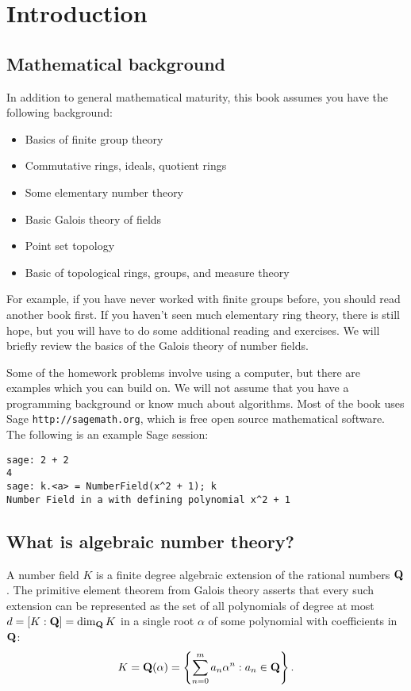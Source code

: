 \chapter{Introduction}

\section{Mathematical background}
In addition to general mathematical maturity, 
this book assumes you have the following background:
\begin{itemize}\setlength{\itemsep}{-.7ex}
\item Basics of finite group theory
\item Commutative rings, ideals, quotient rings
\item Some elementary number theory
\item Basic Galois theory of fields
\item Point set topology
\item Basic of topological rings, groups, and measure theory
\end{itemize}
For example, if you have never worked with finite groups before, you
should read another book first. If you haven't seen much elementary
ring theory, there is still hope, but you will have to do some
additional reading and exercises.  We will briefly review the basics of
the Galois theory of number fields.

Some of the homework problems involve using a computer, but there
are examples which you can build on.  We will not assume that you have
a programming background or know much about algorithms. Most
of the book uses Sage {\tt http://sagemath.org}, which is
free open source mathematical software.  The following is an example
Sage session:
\begin{verbatim}
sage: 2 + 2
4 
sage: k.<a> = NumberField(x^2 + 1); k
Number Field in a with defining polynomial x^2 + 1
\end{verbatim}

\section{What is algebraic number theory?}
A number field $K$ is a finite degree algebraic extension of the rational
numbers $\mathbf{Q}$.  The primitive element theorem from Galois theory
asserts that every such extension can be represented as the set of all
polynomials of degree at most $d = [K:\mathbf{Q}] = \dim_{\mathbf{Q}} K$ in 
a single root $\alpha$ of some polynomial with coefficients in $\mathbf{Q}$:
$$
 K = \mathbf{Q}(\alpha) = \left\{ \sum_{n=0}^{m} a_n \alpha^n : a_n\in\mathbf{Q} \right\}.
$$ 
\begin{comment}
Note that
$\Q(\alpha)$ is non-canonically isomorphic to $\Q[x]/(f)$, where $f$
is the minimal polynomial of~$\alpha$.  The isomorphism is induced by
the homomorphism $\Q[x]\to\Q(\alpha)$ that sends~$x$ to~$\alpha$,
which has kernel~$(f)$.  It is not canonical, since $\Q(\alpha)$ could
have nontrivial automorphisms.  For example, if $\alpha=\sqrt{2}$, then
$\Q(\sqrt{2})$ is isomorphic as a field to $\Q(-\sqrt{2})$ via
$\sqrt{2}\mapsto -\sqrt{2}$.  There are two isomorphisms
$\Q[x]/(x^2-2)\to \Q(\sqrt{2})$.
\end{comment}


